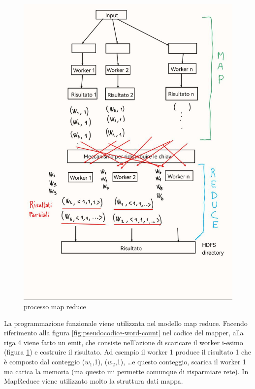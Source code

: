 \documentclass[italian,10pt,a4paper]{report}
\begin{document}
	\begin{figure}
		\centering
		\includegraphics[width=\linewidth]{img/map-reduce-tablet}
		\caption{processo map reduce}
		\label{fig:map-reduce-tablet}
	\end{figure}
	La programmazione funzionale viene utilizzata nel modello map reduce. Facendo riferimento alla figura \ref{fig:pseudocodice-word-count} nel codice del mapper, alla riga 4 viene fatto un emit, che consiste nell'azione di scaricare il worker i-esimo (figura \ref{fig:map-reduce-tablet}) e costruire il risultato. Ad esempio il worker 1 produce il risultato 1 che è composto dal conteggio ($w_1$,1), ($w_2$,1), \dots e questo conteggio, scarica il worker 1 ma carica la memoria (ma questo mi permette comunque di risparmiare rete). In MapReduce viene utilizzato molto la struttura dati mappa. 
	
\end{document}
